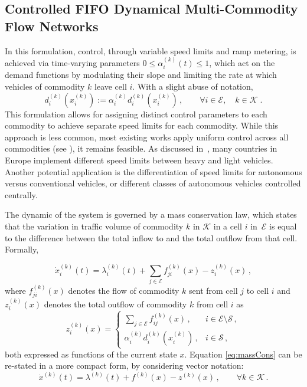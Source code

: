 \documentclass[preprint,12pt]{elsarticle}
\newcommand{\be}{\begin{equation}}
\newcommand{\ee}{\end{equation}}
\newcommand{\mc}{\mathcal}
\begin{document}
\subsection{Controlled FIFO Dynamical Multi-Commodity Flow Networks}

	
 In this formulation, control, through variable speed limits and ramp metering, is achieved via time-varying parameters $0 \leq \alpha_i^{(k)}(t) \leq 1$, which act on the demand functions by modulating their slope and limiting the rate at which vehicles of commodity $k$ leave cell $i$. With a slight abuse of notation,
\be\label{eq:alfa}
d_i^{(k)}(x_i^{(k)}) := \alpha_i^{(k)}d_i^{(k)}(x_i^{(k)})\,, \qquad \forall i \in \mc{E}, \quad k \in \mc{K}\;.
\ee
This formulation allows for assigning distinct control parameters to each commodity to achieve separate speed limits for each commodity. While this approach is less common, most existing works apply uniform control across all commodities (see \cite{SO-DTA}), it remains feasible. As discussed in~\cite{Multi_comm}, many countries in Europe implement different speed limits between heavy and light vehicles. Another potential application is the differentiation of speed limits for autonomous versus conventional vehicles, or different classes of autonomous vehicles controlled centrally.

The dynamic of the system is governed by a mass conservation law, which states that the variation in traffic volume of commodity $k$ in $\mc{K}$ in a cell $i$ in~$\mc{E}$ is equal to the difference between the total inflow to and the total outflow from that cell. Formally,

\be\label{eq:massCons}
	\dot{x}_{i}^{(k)}(t)  =   \lambda_{i}^{(k)}(t) + \sum\limits_{j \in \mathcal{E}}{f_{ji}^{(k)}(x)}  - z_{i}^{(k)}(x) \,,
\ee
where $f_{ji}^{(k)}(x)$ denotes the flow of commodity $k$ sent from cell $j$ to cell $i$ and $z_i^{(k)}(x)$ denotes the total outflow of commodity $k$ from cell $i$ as
\be\label{eq:zik}
		z_{i}^{(k)}(x)  =  \begin{cases}
		\sum\limits_{j \in \mathcal{E}}{f_{ij}^{(k)}( x)} \,, & i \in \mathcal{E} \setminus \mathcal{S} \,, \\
		\alpha_i^{(k)}d_{i}^{(k)}(x_{i}^{(k)}) \,, & i \in \mathcal{S}\,,
	\end{cases}
\ee
both expressed as functions of the current state $x$. Equation \eqref{eq:massCons} can be re-stated in a more compact form, by considering vector notation:
	\be\label{compact}
\dot{x}^{(k)}(t) = \lambda^{(k)}(t) + f^{(k)}(x) - z^{(k)}(x) \,, \qquad \forall k \in \mathcal{K}\,.
\ee
\end{document}
